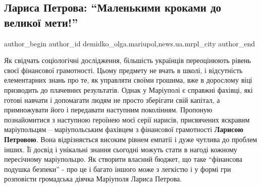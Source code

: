  
 
 
 
 
 
\subsection{Лариса Петрова: \enquote{Маленькими кроками до великої мети!}}
\label{sec:07_07_2019.stz.news.ua.mrpl_city.1.larysa_petrova_malenkymy_krokamy_do_velykoj_mety}
 
\ifcmt
 author_begin
   author_id demidko_olga.mariupol,news.ua.mrpl_city
 author_end
\fi


Як свідчать соціологічні дослідження, більшість українців переоцінюють рівень
своєї фінансової грамотності. Цьому предмету не вчать в школі, і відсутність
елементарних знань про те, як управляти своїми грошима, вже в дорослому віці
призводить до плачевних результатів. Однак у Маріуполі є справжні фахівці, які
готові навчати і допомагати людям не просто зберігати свій капітал, а
примножувати його і передавати наступним поколінням. Пропоную познайомитися з
наступною героїнею моєї серії нарисів, присвячених яскравим маріупольцям –
маріупольським фахівцем з фінансової грамотності \textbf{Ларисою Петровою}. Вона
відрізняється високим рівнем емпатії і дуже чутлива до проблем інших. Її досвід
і унікальні знання сьогодні можуть стати в нагоді кожному пересічному
маріупольцю. Як створити власний бюджет, що таке \enquote{фінансова подушка безпеки} -
про це і багато іншого може з легкістю і у формі гри розповісти громадська
діячка Маріуполя Лариса Петрова.

